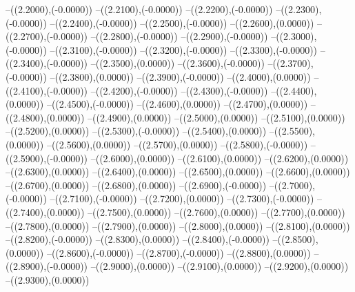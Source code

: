 {	--({\sx*(2.2000)},{\sy*(-0.0000)})
	--({\sx*(2.2100)},{\sy*(-0.0000)})
	--({\sx*(2.2200)},{\sy*(-0.0000)})
	--({\sx*(2.2300)},{\sy*(-0.0000)})
	--({\sx*(2.2400)},{\sy*(-0.0000)})
	--({\sx*(2.2500)},{\sy*(-0.0000)})
	--({\sx*(2.2600)},{\sy*(0.0000)})
	--({\sx*(2.2700)},{\sy*(-0.0000)})
	--({\sx*(2.2800)},{\sy*(-0.0000)})
	--({\sx*(2.2900)},{\sy*(-0.0000)})
	--({\sx*(2.3000)},{\sy*(-0.0000)})
	--({\sx*(2.3100)},{\sy*(-0.0000)})
	--({\sx*(2.3200)},{\sy*(-0.0000)})
	--({\sx*(2.3300)},{\sy*(-0.0000)})
	--({\sx*(2.3400)},{\sy*(-0.0000)})
	--({\sx*(2.3500)},{\sy*(0.0000)})
	--({\sx*(2.3600)},{\sy*(-0.0000)})
	--({\sx*(2.3700)},{\sy*(-0.0000)})
	--({\sx*(2.3800)},{\sy*(0.0000)})
	--({\sx*(2.3900)},{\sy*(-0.0000)})
	--({\sx*(2.4000)},{\sy*(0.0000)})
	--({\sx*(2.4100)},{\sy*(-0.0000)})
	--({\sx*(2.4200)},{\sy*(-0.0000)})
	--({\sx*(2.4300)},{\sy*(-0.0000)})
	--({\sx*(2.4400)},{\sy*(0.0000)})
	--({\sx*(2.4500)},{\sy*(-0.0000)})
	--({\sx*(2.4600)},{\sy*(0.0000)})
	--({\sx*(2.4700)},{\sy*(0.0000)})
	--({\sx*(2.4800)},{\sy*(0.0000)})
	--({\sx*(2.4900)},{\sy*(0.0000)})
	--({\sx*(2.5000)},{\sy*(0.0000)})
	--({\sx*(2.5100)},{\sy*(0.0000)})
	--({\sx*(2.5200)},{\sy*(0.0000)})
	--({\sx*(2.5300)},{\sy*(-0.0000)})
	--({\sx*(2.5400)},{\sy*(0.0000)})
	--({\sx*(2.5500)},{\sy*(0.0000)})
	--({\sx*(2.5600)},{\sy*(0.0000)})
	--({\sx*(2.5700)},{\sy*(0.0000)})
	--({\sx*(2.5800)},{\sy*(-0.0000)})
	--({\sx*(2.5900)},{\sy*(-0.0000)})
	--({\sx*(2.6000)},{\sy*(0.0000)})
	--({\sx*(2.6100)},{\sy*(0.0000)})
	--({\sx*(2.6200)},{\sy*(0.0000)})
	--({\sx*(2.6300)},{\sy*(0.0000)})
	--({\sx*(2.6400)},{\sy*(0.0000)})
	--({\sx*(2.6500)},{\sy*(0.0000)})
	--({\sx*(2.6600)},{\sy*(0.0000)})
	--({\sx*(2.6700)},{\sy*(0.0000)})
	--({\sx*(2.6800)},{\sy*(0.0000)})
	--({\sx*(2.6900)},{\sy*(-0.0000)})
	--({\sx*(2.7000)},{\sy*(-0.0000)})
	--({\sx*(2.7100)},{\sy*(-0.0000)})
	--({\sx*(2.7200)},{\sy*(0.0000)})
	--({\sx*(2.7300)},{\sy*(-0.0000)})
	--({\sx*(2.7400)},{\sy*(0.0000)})
	--({\sx*(2.7500)},{\sy*(0.0000)})
	--({\sx*(2.7600)},{\sy*(0.0000)})
	--({\sx*(2.7700)},{\sy*(0.0000)})
	--({\sx*(2.7800)},{\sy*(0.0000)})
	--({\sx*(2.7900)},{\sy*(0.0000)})
	--({\sx*(2.8000)},{\sy*(0.0000)})
	--({\sx*(2.8100)},{\sy*(0.0000)})
	--({\sx*(2.8200)},{\sy*(-0.0000)})
	--({\sx*(2.8300)},{\sy*(0.0000)})
	--({\sx*(2.8400)},{\sy*(-0.0000)})
	--({\sx*(2.8500)},{\sy*(0.0000)})
	--({\sx*(2.8600)},{\sy*(-0.0000)})
	--({\sx*(2.8700)},{\sy*(-0.0000)})
	--({\sx*(2.8800)},{\sy*(0.0000)})
	--({\sx*(2.8900)},{\sy*(-0.0000)})
	--({\sx*(2.9000)},{\sy*(0.0000)})
	--({\sx*(2.9100)},{\sy*(0.0000)})
	--({\sx*(2.9200)},{\sy*(0.0000)})
	--({\sx*(2.9300)},{\sy*(0.0000)})
}
